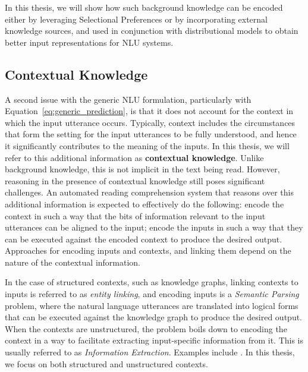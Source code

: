 In this thesis, we will show how such background knowledge can be encoded either by leveraging Selectional Preferences
or by incorporating external knowledge sources, and used in conjunction with distributional models to obtain better input representations
for NLU systems.

\subsection{Contextual Knowledge}
A second issue with the generic NLU formulation, particularly with Equation~\ref{eq:generic_prediction}, is that it does not account for the context
in which the input utterance occurs. Typically, context includes the circumstances that form the setting for the input utterances to be fully understood,
and hence it significantly contributes to the meaning of the inputs. In this thesis, we will refer to this additional information as \textbf{contextual knowledge}.
Unlike background knowledge, this is not implicit in the
text being read. However, reasoning in the presence of contextual knowledge still poses significant challenges. An automated reading comprehension system that
reasons over this additional information is expected to effectively do the following: encode the context in such a way that the bits of information relevant to the input
utterances can be aligned to the input; encode the inputs in such a way that they can be executed against the encoded context to produce the desired output. Approaches
for encoding inputs and contexts, and linking them depend on the nature of the contextual information.

In the case of structured contexts, such as knowledge graphs, linking contexts
to inputs is referred to as \emph{entity linking}, and encoding inputs is a \emph{Semantic Parsing} problem, where the natural language utterances are translated into
logical forms that can be executed against the knowledge graph to produce the desired output.
When the contexts are unstructured, the problem boils down to encoding the context in a way to facilitate extracting input-specific information from it. This is usually
referred to as \emph{Information Extraction}.
Examples include \cite{hill2015goldilocks,richardson2013mctest,penas2013qa4mre,breck2001looking}.
In this thesis, we focus on both structured and unstructured contexts.

